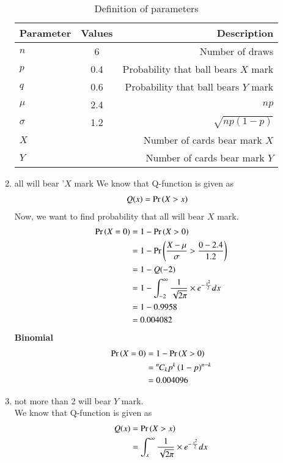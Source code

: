 \documentclass[journal,12pt,twocolumn]{IEEEtran}
\theoremstyle{remark}
\begin{document}
\begin{enumerate}
\begin{table}[!ht]
\centering
\begin{tabular}{|l|c|r|}
    \hline
    Parameter & Values & Description\\
    \hline
    $n$ & 6 & Number of draws\\
    \hline
    $p$ & 0.4 & Probability that ball bears $X$ mark \\
    \hline
    $q$ & 0.6 & Probability that ball bears $Y$ mark \\
    \hline
    $\mu$ & 2.4 & $np$ \\
    \hline
    $\sigma $ & 1.2 & $\sqrt{np(1 - p)} $\\
    \hline
    $X$ &  & Number of cards bear mark $X$ \\
    \hline
    $Y$ &  & Number of cards bear mark $Y$ \\
    \hline
\end{tabular}
\caption{Definition of parameters}
\label{tab:gaussian/9/3/17}
\end{table}
\item all will bear '$X$ mark
We know that Q-function is given as
\begin{align}
Q(x) &= \Pr\left(X > x\right)
\end{align}
Now, we want to find probability that all will bear $X$ mark.
\begin{align}
\Pr\left(X = 0\right) &=1-\Pr\left(X > 0\right) \\
&=1-\Pr\left(\frac{X - \mu}{\sigma} > \frac{0 - 2.4}{1.2}\right) \\
&= 1- Q(-2)\\
&= 1- \int_{-2}^{\infty}\frac{1}{\sqrt{2\pi}}\times e^{-\frac{x^2}{2}}dx\\
&= 1-0.9958\\
&=0.004082
\end{align}
\textbf{Binomial}
\begin{align}
\Pr\left(X =0\right) &= 1 - \Pr\left(X> 0\right) \\
&= {{}^{n}\mkern-1muC_{k}}p^k\left(1-p\right)^{n-k} \\
&= 0.004096
\end{align}
\item not more than 2 will bear $Y$ mark.\\
We know that Q-function is given as\\
\begin{align}
Q(x) &= \Pr\left(X > x\right)\\
&= \int_{x}^{\infty}\frac{1}{\sqrt{2\pi}}\times e^{-\frac{x^2}{2}}dx
\end{align}

\end{enumerate}
\end{document}
